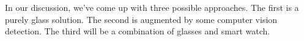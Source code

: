 
In our discussion, we've come up with three possible approaches. The first is a purely glass solution. The second is augmented by some computer vision detection. The third  will be a combination of glasses and smart watch. 




